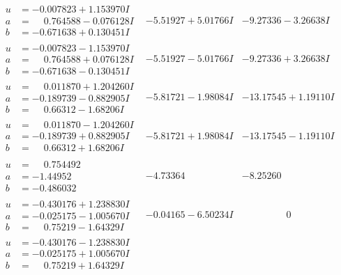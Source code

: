 \documentclass[1p]{elsarticle_modified}
\theoremstyle{definition}
\begin{document}
$$\begin{array}{c|c|c}
\begin{aligned}
u &= -0.007823 + 1.153970 I \\
a &= \phantom{-}0.764588 - 0.076128 I \\
b &= -0.671638 + 0.130451 I\end{aligned}
 & -5.51927 + 5.01766 I & -9.27336 - 3.26638 I \\ \hline\begin{aligned}
u &= -0.007823 - 1.153970 I \\
a &= \phantom{-}0.764588 + 0.076128 I \\
b &= -0.671638 - 0.130451 I\end{aligned}
 & -5.51927 - 5.01766 I & -9.27336 + 3.26638 I \\ \hline\begin{aligned}
u &= \phantom{-}0.011870 + 1.204260 I \\
a &= -0.189739 - 0.882905 I \\
b &= \phantom{-}0.66312 - 1.68206 I\end{aligned}
 & -5.81721 - 1.98084 I & -13.17545 + 1.19110 I \\ \hline\begin{aligned}
u &= \phantom{-}0.011870 - 1.204260 I \\
a &= -0.189739 + 0.882905 I \\
b &= \phantom{-}0.66312 + 1.68206 I\end{aligned}
 & -5.81721 + 1.98084 I & -13.17545 - 1.19110 I \\ \hline\begin{aligned}
u &= \phantom{-}0.754492\phantom{ +0.000000I} \\
a &= -1.44952\phantom{ +0.000000I} \\
b &= -0.486032\phantom{ +0.000000I}\end{aligned}
 & -4.73364\phantom{ +0.000000I} & -8.25260\phantom{ +0.000000I} \\ \hline\begin{aligned}
u &= -0.430176 + 1.238830 I \\
a &= -0.025175 - 1.005670 I \\
b &= \phantom{-}0.75219 - 1.64329 I\end{aligned}
 & -0.04165 - 6.50234 I & \phantom{-0.000000 } 0 \\ \hline\begin{aligned}
u &= -0.430176 - 1.238830 I \\
a &= -0.025175 + 1.005670 I \\
b &= \phantom{-}0.75219 + 1.64329 I\end{aligned}

\end{array}$$
\end{document}
